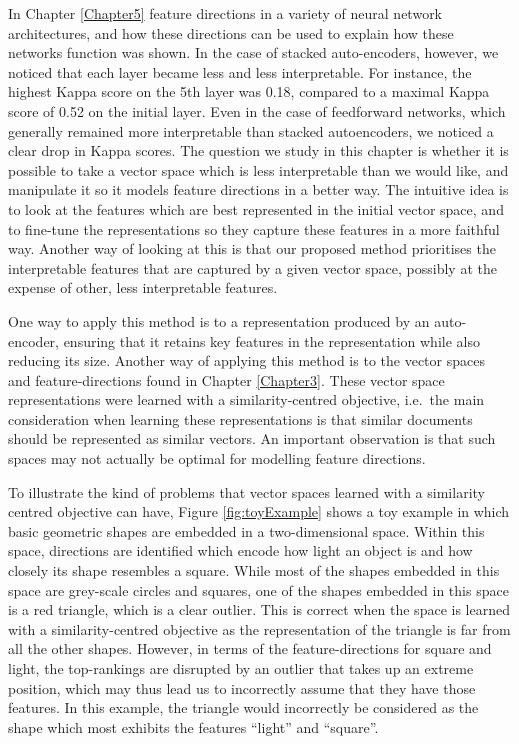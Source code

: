 In Chapter \ref{Chapter5}  feature directions in a variety of neural network architectures, and how these directions can be used to explain how these networks function was shown. In the case of stacked auto-encoders, however, we noticed that each layer became less and less interpretable. For instance, the highest Kappa score on the 5th layer was 0.18, compared to a maximal Kappa score of 0.52 on the initial layer. Even in the case of feedforward networks, which generally remained more interpretable than stacked autoencoders, we noticed a clear drop in Kappa scores. The question we study in this chapter is whether it is possible to take a vector space which is less interpretable than we would like, and manipulate it so it models feature directions in a better way. The intuitive idea is to look at the features which are best represented in the initial vector space, and to fine-tune the representations so they capture these features in a more faithful way. Another way of looking at this is that our proposed method prioritises the interpretable features that are captured by a given vector space, possibly at the expense of other, less interpretable features.

One way to apply this method is to a representation produced by an auto-encoder, ensuring that it retains key features in the representation while also reducing its size. %
 Another way of applying this method is to the vector spaces and feature-directions found in Chapter \ref{Chapter3}. These vector space representations were learned with a similarity-centred objective, i.e.\ the main consideration when learning these representations is that similar documents should be represented as similar vectors. An important observation is that such spaces may not actually be optimal for modelling feature directions. 

  To illustrate the kind of problems that vector spaces learned with a similarity centred objective can have, Figure \ref{fig:toyExample} shows a toy example in which basic geometric shapes are embedded in a two-dimensional space. Within this space, directions are identified which encode how light an object is and how closely its shape resembles a square. While most of the shapes embedded in this space are grey-scale circles and squares, one of the shapes embedded in this space is a red triangle, which is a clear outlier. This  is correct when the space is learned with a similarity-centred objective as the representation of the triangle is far from all the other shapes. However, in terms of the feature-directions for square and light, the top-rankings are disrupted by an outlier that takes up an extreme position, which may thus lead us to incorrectly assume that they have those features. In this example, the triangle would incorrectly be considered as the shape which most exhibits the features ``light'' and ``square''.


